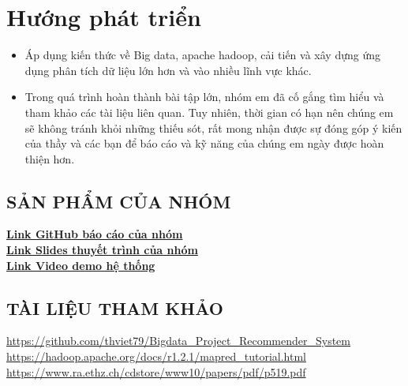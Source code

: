 \documentclass{report}
\begin{document}
\section{Hướng phát triển}
\begin{itemize}
    \item Áp dụng kiến thức về Big data, apache hadoop, cải tiến và xây dựng ứng dụng phân tích
          dữ liệu lớn hơn và vào nhiều lĩnh vực khác.
    \item Trong quá trình hoàn thành bài tập lớn, nhóm em đã cố gắng tìm hiểu và tham khảo các
          tài liệu liên quan. Tuy nhiên, thời gian có hạn nên chúng em sẽ không tránh khỏi những
          thiếu sót, rất mong nhận được sự đóng góp ý kiến của thầy và các bạn để báo cáo và kỹ năng
          của chúng em ngày được hoàn thiện hơn.
\end{itemize}

\begin{center}
    \section*{SẢN PHẨM CỦA NHÓM}
\end{center}
\begin{flushleft}
    \vspace{0.5cm}
    \href{https://github.com/manhbd-22022602/Bigdata-Movie-Recommendation}{\textbf{Link GitHub báo cáo của nhóm}}\\
    \vspace{0.5cm}
    \href{https://www.canva.com/design/DAGGDTSDSVg/zqqq_q9GcmJw8djuh1G9Kg/edit}{\textbf{Link Slides thuyết trình của nhóm}}\\
    \vspace{0.5cm}
    \href{https://www.youtube.com/watch?v=rOyGpW_HzME}{\textbf{Link Video demo hệ thống}}
\end{flushleft}

\begin{center}
    \section*{TÀI LIỆU THAM KHẢO}
\end{center}
\begin{flushleft}
    \vspace{0.5cm}
    \url{https://github.com/thviet79/Bigdata_Project_Recommender_System}\\
    \vspace{0.5cm}
    \url{https://hadoop.apache.org/docs/r1.2.1/mapred_tutorial.html}\\
    \vspace{0.5cm}
    \url{https://www.ra.ethz.ch/cdstore/www10/papers/pdf/p519.pdf}\\
\end{flushleft}
\end{document}
